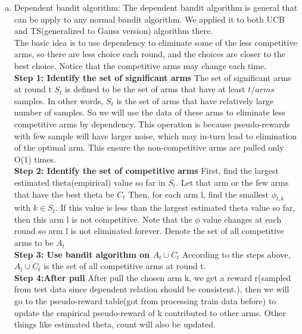 \documentclass{article}
\begin{document}
\begin{homeworkProblem}
\begin{enumerate}
\begin{enumerate}[a.]
            
            \item Dependent bandit algorithm:
            The dependent bandit algorithm is general that can be apply to any normal bandit algorithm. We applied it to both UCB and TS(generalized to Gauss version) algorithm there.\\
            The basic idea is to use dependency to eliminate some of the less competitive arms, so there are less choice each round, and the choices are closer to the best choice. Notice that the competitive arms may change each time.\\
            \textbf{Step 1: Identify the set of significant arms} The set of significant arms at round t $S_t$ is defined to be the set of arms that have at least $t/arms$ samples.
            In other words, $S_t$ is the set of arms that have relatively large number of samples. So we will use the data of these arms to eliminate less competitive arms by dependency. This operation is because pseudo-rewards with few sample will have larger noise, which may in-turn lead to elimination of the optimal arm. This ensure the non-competitive arms are pulled only O(1) times. \\
            \textbf{Step 2: Identify the set of competitive arms} First, find the largest estimated theta(empirical) value so far in $S_t$. Let that arm or the few arms that have the best theta be $C_t$ Then, for each arm l, find the smallest $\phi_{l,k}$ with $k\in S_t$.
            If this value is less than the largest estimated theta value so far, then this arm l is not competitive. Note that the $\phi$ value changes at each round so arm l is not eliminated forever.
            Denote the set of all competitive arms to be $A_t$\\
            \textbf{Step 3: Use bandit algorithm on $A_t\cup C_t$} According to the steps above, $A_t\cup C_t$ is the set of all competitive arms at round t.\\
            \textbf{Step 4:After pull} After pull the chosen arm k, we get a reward r(sampled from test data since dependent relation should be consistent.), then we will go to the pseudo-reward table(got from processing train data before) to update the empirical pseudo-reward of k contributed to other arms. Other things like estimated theta, count will also be updated.


\end{enumerate}
\end{enumerate}
\end{homeworkProblem}
\end{document}
